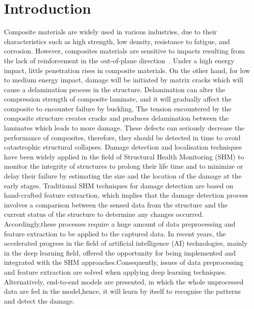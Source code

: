 \documentclass[10pt, twocolumn]{article} %
\begin{document}
	\section{Introduction}
	Composite materials are widely used in various industries, due to their characteristics such as high strength, low density, resistance to fatigue, and corrosion. 
	However, composites materials are sensitive to impacts resulting from the lack of reinforcement in the out-of-plane direction~\cite{Francesconi2019}.
	Under a high energy impact, little penetration rises in composite materials. 
	On the other hand, for low to medium energy impact, damage will be initiated by matrix cracks which will cause a delamination process in the structure.
	Delamination can alter the compression strength of composite laminate, and it will gradually affect the composite to encounter failure by buckling. 
	The tension encountered by the composite structure creates cracks and produces delamination between the laminates which leads to more damage. 
	These defects can seriously decrease the performance of composites, therefore, they should be detected in time to avoid catastrophic structural collapses. Damage detection and localisation techniques have been widely applied in the field of Structural Health Monitoring (SHM) to monitor the integrity of structures to prolong their life time and to minimize or delay their failure by estimating the size and the location of the damage at the early stages.
	Traditional SHM techniques for damage detection are based on hand-crafted feature extraction, which implies that the damage detection process involves a comparison between the sensed data from the structure and the current status of the structure to determine any changes occurred.
	Accordingly,these processes require a huge amount of data preprocessing and feature extraction to be applied to the captured data.
	In recent years, the accelerated progress in the field of artificial intelligence (AI) technologies, mainly in the deep learning field, offered the opportunity for being implemented and integrated with the SHM approaches.Consequently, issues of data preprocessing and feature extraction are solved when applying deep learning techniques. 
	Alternatively, end-to-end models are presented, in which the whole unprocessed data are fed in the model,hence, it will learn by itself to recognise the patterns and detect the damage.
		
\end{document}
